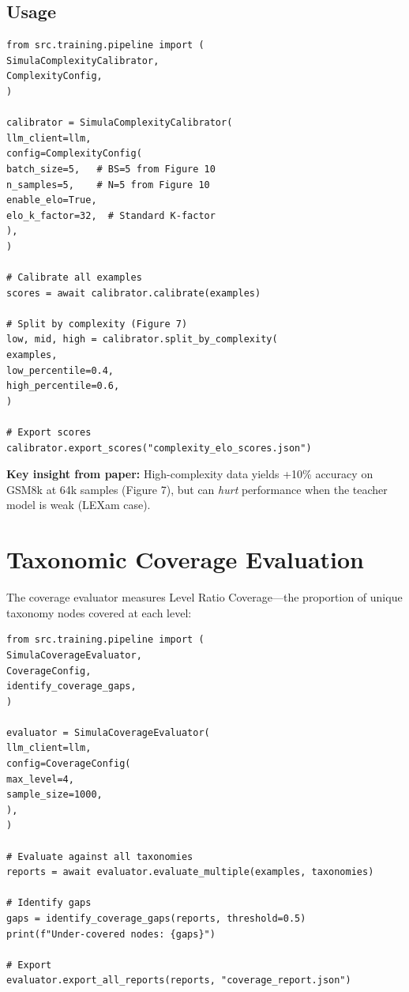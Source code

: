 \documentclass[12pt,a4paper,twoside]{report}
\begin{document}
\subsection{Usage}

\begin{lstlisting}[language=jsonx,caption={Complexity calibrator usage}]
from src.training.pipeline import (
SimulaComplexityCalibrator,
ComplexityConfig,
)

calibrator = SimulaComplexityCalibrator(
llm_client=llm,
config=ComplexityConfig(
batch_size=5,   # BS=5 from Figure 10
n_samples=5,    # N=5 from Figure 10
enable_elo=True,
elo_k_factor=32,  # Standard K-factor
),
)

# Calibrate all examples
scores = await calibrator.calibrate(examples)

# Split by complexity (Figure 7)
low, mid, high = calibrator.split_by_complexity(
examples,
low_percentile=0.4,
high_percentile=0.6,
)

# Export scores
calibrator.export_scores("complexity_elo_scores.json")
\end{lstlisting}

\textbf{Key insight from paper:} High-complexity data yields +10\% accuracy on GSM8k
at 64k samples (Figure 7), but can \emph{hurt} performance when the teacher model
is weak (LEXam case).

\section{Taxonomic Coverage Evaluation}

The coverage evaluator measures Level Ratio Coverage---the proportion of unique
taxonomy nodes covered at each level:

\begin{lstlisting}[language=jsonx,caption={Coverage evaluator usage}]
from src.training.pipeline import (
SimulaCoverageEvaluator,
CoverageConfig,
identify_coverage_gaps,
)

evaluator = SimulaCoverageEvaluator(
llm_client=llm,
config=CoverageConfig(
max_level=4,
sample_size=1000,
),
)

# Evaluate against all taxonomies
reports = await evaluator.evaluate_multiple(examples, taxonomies)

# Identify gaps
gaps = identify_coverage_gaps(reports, threshold=0.5)
print(f"Under-covered nodes: {gaps}")

# Export
evaluator.export_all_reports(reports, "coverage_report.json")
\end{lstlisting}
\end{document}
